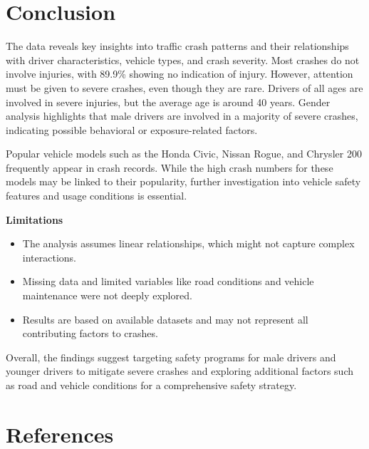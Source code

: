\documentclass[a4paper,12pt]{article}
\begin{document}
\section{Conclusion}

The data reveals key insights into traffic crash patterns and their relationships with driver characteristics, vehicle types, and crash severity. Most crashes do not involve injuries, with 89.9\% showing no indication of injury. However, attention must be given to severe crashes, even though they are rare. Drivers of all ages are involved in severe injuries, but the average age is around 40 years. Gender analysis highlights that male drivers are involved in a majority of severe crashes, indicating possible behavioral or exposure-related factors.

Popular vehicle models such as the Honda Civic, Nissan Rogue, and Chrysler 200 frequently appear in crash records. While the high crash numbers for these models may be linked to their popularity, further investigation into vehicle safety features and usage conditions is essential.

\vspace{12pt}
\textbf{Limitations}
\begin{itemize}
    \item The analysis assumes linear relationships, which might not capture complex interactions.
    \item Missing data and limited variables like road conditions and vehicle maintenance were not deeply explored.
    \item Results are based on available datasets and may not represent all contributing factors to crashes.
\end{itemize}

Overall, the findings suggest targeting safety programs for male drivers and younger drivers to mitigate severe crashes and exploring additional factors such as road and vehicle conditions for a comprehensive safety strategy.





\section{References}


\end{document}
